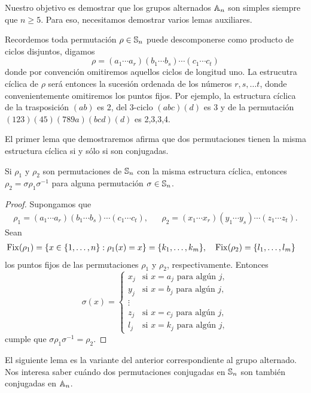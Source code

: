 Nuestro objetivo es demostrar que los grupos alternados $\mathbb{A}_n$ son simples siempre que $n\geq5$. Para eso, necesitamos demostrar
varios lemas auxiliares. 

Recordemos toda permutación $\rho\in\mathbb{S}_n$ puede descomponerse como producto de ciclos disjuntos, digamos
\[
\rho=(a_1\cdots a_r)(b_1\cdots b_s)\cdots (c_1\cdots c_t)
\]
donde por convención omitiremos aquellos ciclos de longitud uno. 
La estrucutra cíclica de $\rho$ será entonces la sucesión ordenada de los números $r,s,\dots t$, 
donde convenientemente omitiremos los puntos fijos. Por ejemplo, la estructura cíclica de la trasposición $(ab)$ es 2, 
del 3-ciclo $(abc)(d)$ es 3 y de la permutación $(123)(45)(789a)(bcd)(d)$ es 2,3,3,4. 
  
El primer lema que demostraremos afirma que dos permutaciones tienen la misma estructura cíclica si y sólo si son conjugadas. 

\begin{lemma}
Si $\rho_1$ y $\rho_2$ son permutaciones de $\mathbb{S}_n$ con la misma estructura cíclica, entonces
$\rho_2=\sigma\rho_1\sigma^{-1}$ para alguna permutación $\sigma\in\mathbb{S}_n$. 
\end{lemma}

\begin{proof}
Supongamos que
\begin{align*}
\rho_1=(a_1\cdots a_r)(b_1\cdots b_s)\cdots (c_1\cdots c_t), && 
\rho_2=(x_1\cdots x_r)(y_1\cdots y_s)\cdots (z_1\cdots z_t).
\end{align*}
Sean 
\begin{align*}
\operatorname{Fix}(\rho_1) &= \{x\in\{1,\dots,n\}:\rho_1(x)=x\}=\{k_1,\dots,k_m\},&&
\operatorname{Fix}(\rho_2)=\{l_1,\dots,l_m\}	
\end{align*}
los puntos fijos de las permutaciones $\rho_1$ y $\rho_2$, respectivamente. Entonces
\[
\sigma(x)=\begin{cases}
x_j & \text{si $x=a_j$ para algún $j$},\\
y_j & \text{si $x=b_j$ para algún $j$},\\
\vdots\\
z_j & \text{si $x=c_j$ para algún $j$},\\
l_j & \text{si $x=k_j$ para algún $j$},	
\end{cases}
\]
cumple que $\sigma\rho_1\sigma^{-1}=\rho_2$. 
\end{proof}

El siguiente lema es la variante del anterior correspondiente al grupo alternado. 
Nos interesa saber cuándo dos permutaciones conjugadas en $\mathbb{S}_n$ son también conjugadas en $\mathbb{A}_n$.

